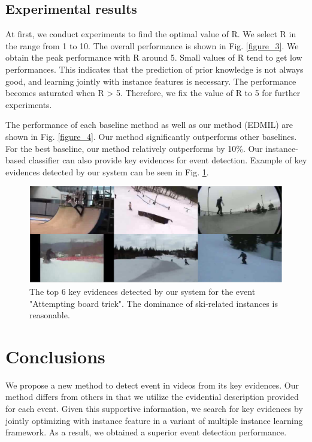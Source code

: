 \subsection{Experimental results}
At first, we conduct experiments to find the optimal value of R. We select R in the range from 1 to 10. The overall performance is shown in Fig. \ref{figure_3}. We obtain the peak performance with R around 5. Small values of R tend to get low performances. This indicates that the prediction of prior knowledge is not always good, and learning jointly with instance features is necessary. The performance becomes saturated when R > 5. Therefore, we fix the value of R to 5 for further experiments.

The performance of each baseline method as well as our method (EDMIL) are shown in Fig. \ref{figure_4}. Our method significantly outperforms other baselines. For the best baseline, our method relatively outperforms by 10\%. Our instance-based classifier can also provide key evidences for event detection. Example of key evidences detected by our system can be seen in Fig. \ref{figure_5}. 
\label{experiment}

\begin{figure}
	\centering
	\includegraphics[width=1\textwidth]{figure_5.pdf}
	\caption{The top 6 key evidences detected by our system for the event "Attempting board trick". The dominance of ski-related instances is reasonable.}
	\label{figure_5}
\end{figure}

\section{Conclusions}
\label{conclusion}
We propose a new method to detect event in videos from its key evidences. Our method differs from others in that we utilize the evidential description provided for each event. Given this supportive information, we search for key evidences by jointly optimizing with instance feature in a variant of multiple instance learning framework. As a result, we obtained a superior event detection performance.

